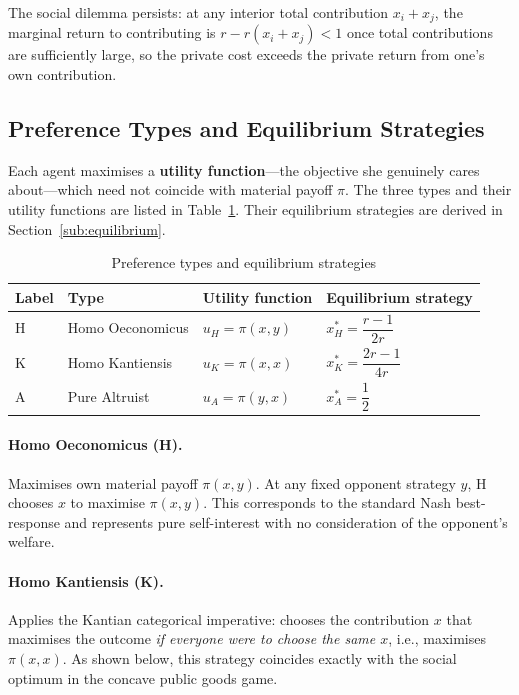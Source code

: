 \documentclass[12pt]{article}
\begin{document}
The social dilemma persists: at any interior total contribution $x_i + x_j$, the marginal return to contributing is $r - r(x_i+x_j) < 1$ once total contributions are sufficiently large, so the private cost exceeds the private return from one's own contribution.

\subsection{Preference Types and Equilibrium Strategies}

Each agent maximises a \textbf{utility function}---the objective she genuinely cares about---which need not coincide with material payoff $\pi$. The three types and their utility functions are listed in Table~\ref{tab:types}. Their equilibrium strategies are derived in Section~\ref{sub:equilibrium}.

\begin{table}[H]
    \centering
    \caption{Preference types and equilibrium strategies}
    \label{tab:types}
    \begin{tabular}{llll}
        \toprule
        Label & Type & Utility function & Equilibrium strategy \\
        \midrule
        H & Homo Oeconomicus & $u_H = \pi(x, y)$ & $x_H^* = \dfrac{r-1}{2r}$ \\[8pt]
        K & Homo Kantiensis  & $u_K = \pi(x, x)$ & $x_K^* = \dfrac{2r-1}{4r}$ \\[8pt]
        A & Pure Altruist    & $u_A = \pi(y, x)$ & $x_A^* = \dfrac{1}{2}$ \\
        \bottomrule
    \end{tabular}
\end{table}

\paragraph{Homo Oeconomicus (H).} Maximises own material payoff $\pi(x,y)$. At any fixed opponent strategy $y$, H chooses $x$ to maximise $\pi(x,y)$. This corresponds to the standard Nash best-response and represents pure self-interest with no consideration of the opponent's welfare.

\paragraph{Homo Kantiensis (K).} Applies the Kantian categorical imperative: chooses the contribution $x$ that maximises the outcome \emph{if everyone were to choose the same $x$}, i.e., maximises $\pi(x,x)$. As shown below, this strategy coincides exactly with the social optimum in the concave public goods game.
\end{document}
